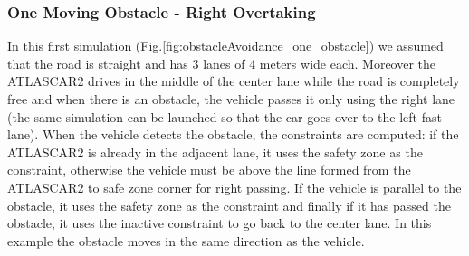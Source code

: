 \documentclass[conference, 11pt]{IEEEtran}
\begin{document}
\subsubsection{One Moving Obstacle - Right Overtaking}
In this first simulation
(Fig.\ref{fig:obstacleAvoidance_one_obstacle}) we assumed that the road is straight and has 3 lanes of 4 meters wide each. Moreover the ATLASCAR2 drives in the middle of the center lane while the road is completely free and when there is an obstacle, the vehicle passes it only using the right lane (the same simulation can be launched so that the car goes over to the left fast lane). When the vehicle detects the obstacle, the constraints are computed: if the ATLASCAR2 is already in the adjacent lane, it uses the safety zone as the constraint, otherwise the vehicle must be above the line formed from the ATLASCAR2 to safe zone corner for right passing. If the vehicle is parallel to the obstacle, it  uses the safety zone as the constraint and finally if it has passed the obstacle, it uses the inactive constraint to go back to the center lane. In this example the obstacle moves in the same direction as the vehicle.
\end{document}
